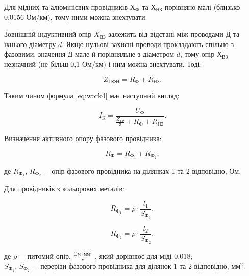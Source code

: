 \vspace{1.5em}

Для мідних та алюмінієвих провідників $Х_{\text{Ф}}$ та $Х_{\text{НЗ}}$ порівняно малі (близько 0,0156 Ом/км), тому ними можна знехтувати.

Зовнішній індуктивний опір $X_{\text{ВЗ}}$ залежить від відстані між проводами Д та їхнього діаметру $d$. Якщо нульові захисні проводи прокладають спільно з фазовими, значення Д  мале й порівняльне з діаметром $d$, тому опір $Х_{\text{ВЗ}}$ незначний (не більш 0,1 Ом/км) і ним можна знехтувати. Тоді:

\begin{equation}\label{eq:work8}
	Z_{\text{ПФН}} = R_{\text{Ф}} + R_{\text{НЗ}}.
\end{equation}

\vspace{1.5em}

Таким чином формула \ref{eq:work4} має наступний вигляд:

\begin{equation}\label{eq:work9}
	I_{\text{К}} = \frac{U_{\text{Ф}}}{\frac{Z_{\text{ТР}}}{3} + R_{\text{Ф}} + R_{\text{НЗ}}}.
\end{equation}

\vspace{1.5em}

Визначення активного опору фазового провідника:

\begin{equation}\label{eq:work10}
	R_{\text{Ф}} = R_{\text{Ф}_{1}} + R_{\text{Ф}_{2}},
\end{equation}

\noindent де $R_{\text{Ф}_{1}}, \, R_{\text{Ф}_{2}}$ $-$ опір фазового провідника на ділянках 1 та 2 відповідно, Ом.

Для провідників з кольорових металів:

\begin{equation}\label{eq:work11}
	R_{\text{Ф}_{1}} = \rho \cdot \frac{l_{1}}{S_{\text{Ф}_{1}}},
\end{equation}

\begin{equation}\label{eq:work12}
	R_{\text{Ф}_{2}} = \rho \cdot \frac{l_{2}}{S_{\text{Ф}_{2}}},
\end{equation}

\noindent де $\rho$ $-$ питомий опір, $\frac{\text{Ом} \cdot \text{мм}^{2}}{\text{м}}$ , який дорівнює для міді 0,018; \\
\hspace*{15pt} $S_{\text{Ф}_{1}}, \, S_{\text{Ф}_{2}}$ $-$ перерізи фазового провідника для ділянок 1 та 2 відповідно, $\text{мм}^{2}$.

